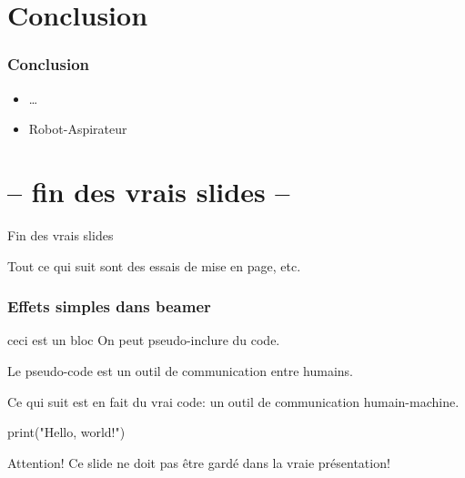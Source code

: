 \documentclass{beamer}
\begin{document}
\section{Conclusion}
\begin{frame}
  \frametitle{Conclusion}
  \begin{itemize}
  \item \ldots
  \item Robot-Aspirateur
  \end{itemize}
\end{frame}

\section*{-- fin des vrais slides --}

\begin{frame}
  \begin{center}
    {\Huge Fin des vrais slides}
    \par\bigskip
    Tout ce qui suit sont des essais de mise en page, etc.
  \end{center}
\end{frame}

\begin{frame}
  \frametitle{Effets simples dans beamer}
  \begin{block}{ceci est un bloc}
    On peut pseudo-inclure du code.
  \end{block}
  \begin{definition}
    Le pseudo-code est un outil de communication entre humains.
  \end{definition}
  \begin{example}
    Ce qui suit est en fait du vrai code: un outil de communication humain-machine.
  \end{example}
  \begin{semiverbatim}
    print("Hello, world!")
  \end{semiverbatim}
  \begin{alertblock}{Attention!}
    Ce slide ne doit pas être gardé dans la vraie présentation!
  \end{alertblock}
\end{frame}
\end{document}
